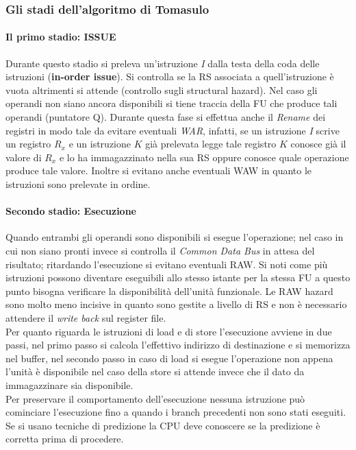 \subsubsection{Gli stadi dell'algoritmo di Tomasulo}
\paragraph{Il primo stadio: ISSUE}
Durante questo stadio si preleva un'istruzione \emph{I} dalla testa della coda delle istruzioni (\textbf{in-order issue}). Si controlla se la RS associata a quell'istruzione è vuota altrimenti si attende (controllo sugli structural hazard). Nel caso gli operandi non siano ancora disponibili si tiene traccia della FU che produce tali operandi (puntatore Q). Durante questa fase si effettua anche il \emph{Rename} dei registri in modo tale da evitare eventuali \emph{WAR}, infatti, se un istruzione \emph{I} scrive un registro \emph{$R_x$} e un istruzione $K$ già prelevata legge tale registro $K$ conosce già il valore di $R_x$ e lo ha immagazzinato nella sua RS oppure conosce quale operazione produce tale valore. Inoltre si evitano anche eventuali WAW in quanto le istruzioni sono prelevate in ordine.
\paragraph{Secondo stadio: Esecuzione}
Quando entrambi gli operandi sono disponibili si esegue l'operazione; nel caso in cui non siano pronti invece si controlla il \emph{Common Data Bus} in attesa del risultato; ritardando l'esecuzione si evitano eventuali RAW. Si noti come più istruzioni possono diventare eseguibili allo stesso istante per la stessa FU a questo punto bisogna verificare la disponibilità dell'unità funzionale. Le RAW hazard sono molto meno incisive in quanto sono gestite a livello di RS e non è necessario attendere il \emph{write back} sul register file.\\
Per quanto riguarda le istruzioni di load e di store l'esecuzione avviene in due passi, nel primo passo si calcola l'effettivo indirizzo di destinazione e si memorizza nel buffer, nel secondo passo in caso di load si esegue l'operazione non appena l'unità è disponibile nel caso della store si attende invece che il dato da immagazzinare sia disponibile.\\
Per preservare il comportamento dell'esecuzione nessuna istruzione può cominciare l'esecuzione fino a quando i branch precedenti non sono stati eseguiti. Se si usano tecniche di predizione la CPU deve conoscere se la predizione è corretta prima di procedere.
